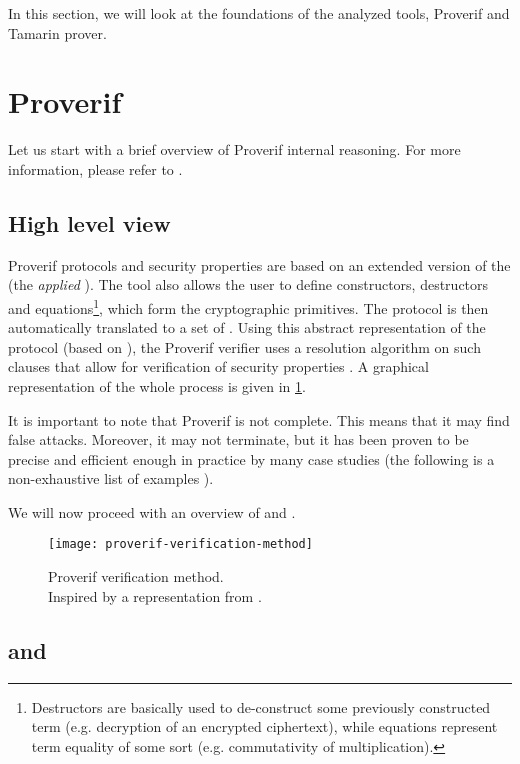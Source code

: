 In this section, we will look at the foundations of the analyzed tools, Proverif and Tamarin prover.


\section{Proverif}
Let us start with a brief overview of Proverif internal reasoning. For more information, please refer to \cite{SymbolicComputationalBlanchet, SymbolicVerificationBlanchet, ProverifManual}.

\subsection{High level view}
Proverif protocols and security properties are based on an extended version of the \pic{} (the \textit{applied} \pic{}). The tool also allows the user to define constructors, destructors and equations\footnote{Destructors are basically used to de-construct some previously constructed term (e.g. decryption of an encrypted ciphertext), while equations represent term equality of some sort (e.g. commutativity of multiplication).}, which form the cryptographic primitives. The protocol is then automatically translated to a set of \Horncs{}. Using this abstract representation of the protocol (based on \Horncs{}), the Proverif verifier uses a resolution algorithm on such clauses that allow for verification of security properties \cite{SymbolicComputationalBlanchet}.
A graphical representation of the whole process is given in \cref{fig:proverif-verification-method}.

It is important to note that Proverif is not complete. This means that it may find false attacks. Moreover, it may not terminate, but it has been proven to be precise and efficient enough in practice by many case studies (the following is a non-exhaustive list of examples \cite{10.1145/1266977.1266978, ABADI20053, hal-01575923, MTProto2-Proverif}).

We will now proceed with an overview of \pic{} and \Horncs{}.

\begin{figure}[t]
    \texttt{[image: proverif-verification-method]}
    \centering
    \caption{Proverif verification method.\\Inspired by a representation from \BLANC{} \cite{SymbolicComputationalBlanchet}.}
    \label{fig:proverif-verification-method}
\end{figure}

\subsection{\pic{} and \apic{}}
\label{subsec:pic-apic}

